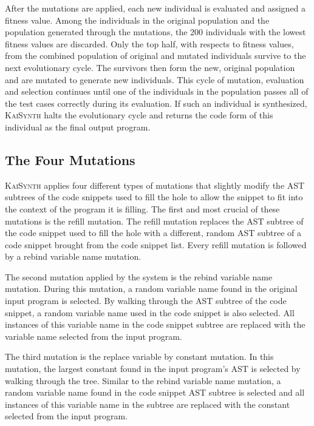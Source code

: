 \documentclass{article}
\begin{document}
After the mutations are applied, each new individual is evaluated and assigned a fitness value. Among the individuals in the original population and the population generated through the mutations, the 200 individuals with the lowest fitness values are discarded. Only the top half, with respects to fitness values, from the combined population of original and mutated individuals survive to the next evolutionary cycle. The survivors then form the new, original population and are mutated to generate new individuals. This cycle of mutation, evaluation and selection continues until one of the individuals in the population passes all of the test cases correctly during its evaluation. If such an individual is synthesized, \textsc{KaiSynth} halts the evolutionary cycle and returns the code form of this individual as the final output program.

\subsection{The Four Mutations}

\textsc{KaiSynth} applies four different types of mutations that slightly modify the AST subtrees of the code snippets used to fill the hole to allow the snippet to fit into the context of the program it is filling. The first and most crucial of these mutations is the refill mutation. The refill mutation replaces the AST subtree of the code snippet used to fill the hole with a different, random AST subtree of a code snippet brought from the code snippet list. Every refill mutation is followed by a rebind variable name mutation.

The second mutation applied by the system is the rebind variable name mutation. During this mutation, a random variable name found in the original input program is selected. By walking through the AST subtree of the code snippet, a random variable name used in the code snippet is also selected. All instances of this variable name in the code snippet subtree are replaced with the variable name selected from the input program. 

The third mutation is the replace variable by constant mutation. In this mutation, the largest constant found in the input program's AST is selected by walking through the tree. Similar to the rebind variable name mutation, a random variable name found in the code snippet AST subtree is selected and all instances of this variable name in the subtree are replaced with the constant selected from the input program.
\end{document}
